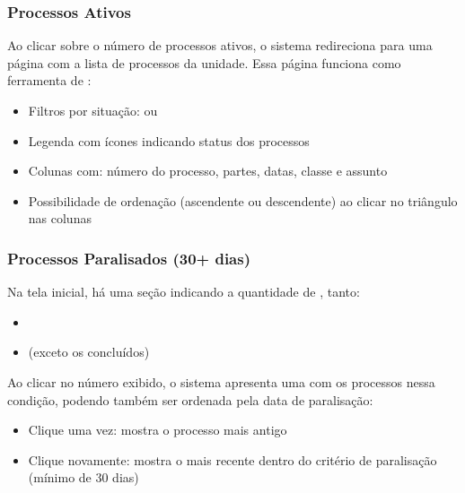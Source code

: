 \documentclass[letterpaper,10pt,brazil]{sphinxmanual}
\begin{document}
\subsubsection{Processos Ativos}
\label{\detokenize{projud_03_abainicio:processos-ativos}}
\sphinxAtStartPar
Ao clicar sobre o número de processos ativos, o sistema redireciona para uma página com a lista de processos da unidade. Essa página funciona como ferramenta de :
\begin{itemize}
\item {} 
\sphinxAtStartPar
Filtros por situação:  ou 

\item {} 
\sphinxAtStartPar
Legenda com ícones indicando status dos processos

\item {} 
\sphinxAtStartPar
Colunas com: número do processo, partes, datas, classe e assunto

\item {} 
\sphinxAtStartPar
Possibilidade de ordenação (ascendente ou descendente) ao clicar no triângulo nas colunas

\end{itemize}


\subsubsection{Processos Paralisados (30+ dias)}
\label{\detokenize{projud_03_abainicio:processos-paralisados-30-dias}}
\sphinxAtStartPar
Na tela inicial, há uma seção indicando a quantidade de , tanto:
\begin{itemize}
\item {} 
\sphinxAtStartPar
{}

\item {} 
\sphinxAtStartPar
{} (exceto os concluídos)

\end{itemize}

\sphinxAtStartPar
Ao clicar no número exibido, o sistema apresenta uma  com os processos nessa condição, podendo também ser ordenada pela data de paralisação:
\begin{itemize}
\item {} 
\sphinxAtStartPar
Clique uma vez: mostra o processo mais antigo

\item {} 
\sphinxAtStartPar
Clique novamente: mostra o mais recente dentro do critério de paralisação (mínimo de 30 dias)

\end{itemize}
\end{document}
